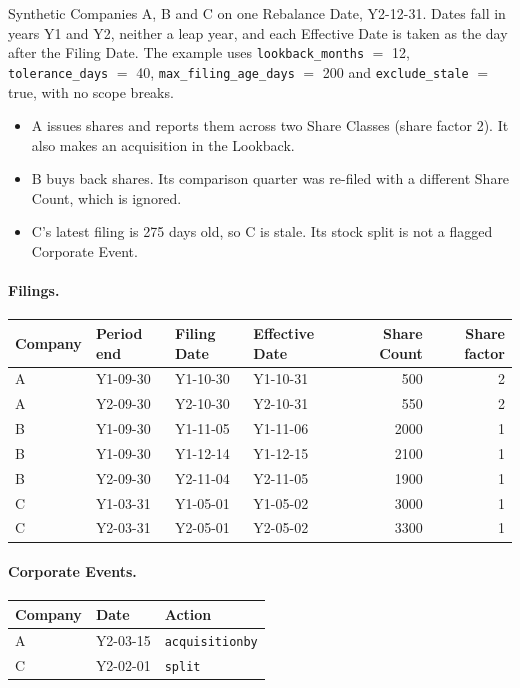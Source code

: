 \documentclass[11pt]{article}
\newcommand{\exrebalance}[1]{#1}
\newcommand{\exparam}[2]{\texttt{#1} $=$ #2}
\newcommand{\exfiling}[6]{#1 & #2 & #3 & #4 & #5 & #6 \\}
\newcommand{\exevent}[3]{#1 & #2 & \texttt{#3} \\}
\begin{document}
Synthetic Companies A, B and C on one Rebalance Date, \exrebalance{Y2-12-31}. Dates fall in
years Y1 and Y2, neither a leap year, and each Effective Date is taken as the day after the
Filing Date. The example uses \exparam{lookback\_months}{12}, \exparam{tolerance\_days}{40},
\exparam{max\_filing\_age\_days}{200} and \exparam{exclude\_stale}{true}, with no scope breaks.

\begin{itemize}
  \item A issues shares and reports them across two Share Classes (share factor 2). It also
    makes an acquisition in the Lookback.
  \item B buys back shares. Its comparison quarter was re-filed with a different Share Count,
    which is ignored.
  \item C's latest filing is 275 days old, so C is stale. Its stock split is not a flagged
    Corporate Event.
\end{itemize}

\paragraph{Filings.}
\begin{center}
\begin{tabular}{l l l l r r}
\toprule
Company & Period end & Filing Date & Effective Date & Share Count & Share factor \\
\midrule
\exfiling{A}{Y1-09-30}{Y1-10-30}{Y1-10-31}{500}{2}
\exfiling{A}{Y2-09-30}{Y2-10-30}{Y2-10-31}{550}{2}
\exfiling{B}{Y1-09-30}{Y1-11-05}{Y1-11-06}{2000}{1}
\exfiling{B}{Y1-09-30}{Y1-12-14}{Y1-12-15}{2100}{1}
\exfiling{B}{Y2-09-30}{Y2-11-04}{Y2-11-05}{1900}{1}
\exfiling{C}{Y1-03-31}{Y1-05-01}{Y1-05-02}{3000}{1}
\exfiling{C}{Y2-03-31}{Y2-05-01}{Y2-05-02}{3300}{1}
\bottomrule
\end{tabular}
\end{center}

\paragraph{Corporate Events.}
\begin{center}
\begin{tabular}{l l l}
\toprule
Company & Date & Action \\
\midrule
\exevent{A}{Y2-03-15}{acquisitionby}
\exevent{C}{Y2-02-01}{split}
\bottomrule
\end{tabular}
\end{center}
\end{document}
